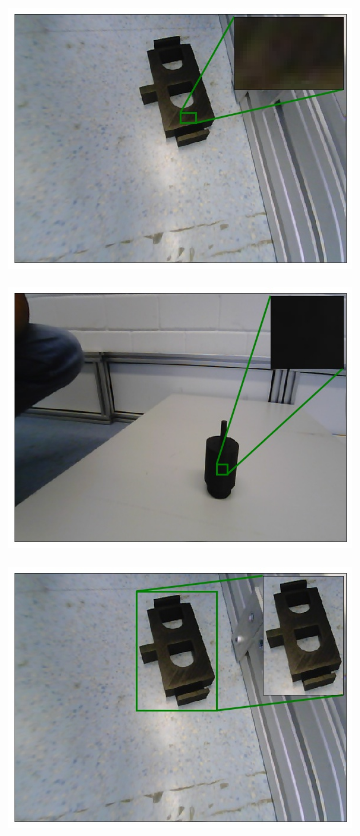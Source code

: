 	\begin{figure}
		\centering
		\begin{subfigure}{.4\textwidth}
			\centering
			\includegraphics[width=.9\linewidth]{images/em_01_context_l}
			\caption{}
			\label{Fig:em01l}
		\end{subfigure}
		\begin{subfigure}{.4\textwidth}
			\centering
			\includegraphics[width=.9\linewidth]{images/motor_context_l}
			\caption{}
			\label{Fig:motorl}
		\end{subfigure}
		\begin{subfigure}{.4\textwidth}
			\centering
			\includegraphics[width=.9\linewidth]{images/em_01_context_g}

\end{subfigure}
\end{figure}
